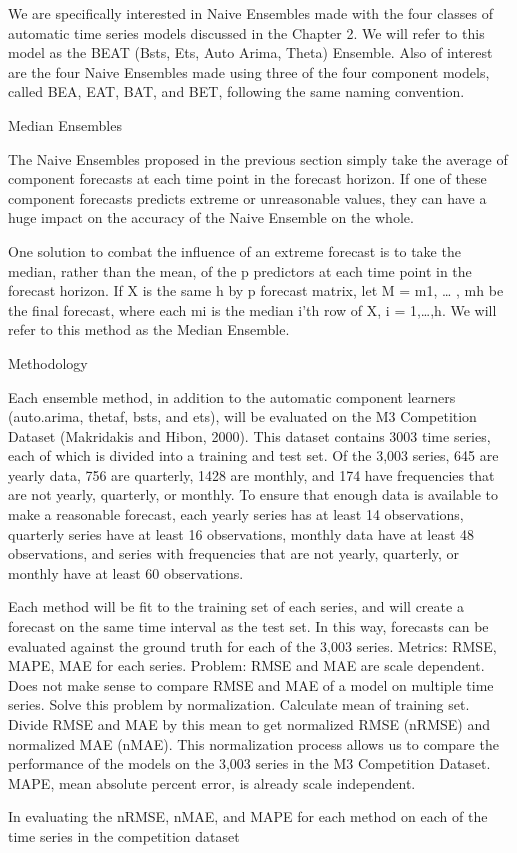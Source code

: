 \documentclass [M] {uclathes}
\begin{document}
We are specifically interested in Naive Ensembles made with the four classes of automatic time series models discussed in the Chapter 2. We will refer to this model as the BEAT (Bsts, Ets, Auto Arima, Theta) Ensemble. Also of interest are the four Naive Ensembles made using three of the four component models, called BEA, EAT, BAT, and BET, following the same naming convention.

Median Ensembles

The Naive Ensembles proposed in the previous section simply take the average of component forecasts at each time point in the forecast horizon. If one of these component forecasts predicts extreme or unreasonable values, they can have a huge impact on the accuracy of the Naive Ensemble on the whole.

One solution to combat the influence of an extreme forecast is to take the median, rather than the mean, of the p predictors at each time point in the forecast horizon. If X is the same h by p forecast matrix, let M = m1, … , mh be the final forecast, where each mi is the median i’th row of X, i = 1,…,h. We will refer to this method as the Median Ensemble.

Methodology

Each ensemble method, in addition to the automatic component learners (auto.arima, thetaf, bsts, and ets), will be evaluated on the M3 Competition Dataset (Makridakis and Hibon, 2000). This dataset contains 3003 time series, each of which is divided into a training and test set. Of the 3,003 series, 645 are yearly data, 756 are quarterly, 1428 are monthly, and 174 have frequencies that are not yearly, quarterly, or monthly. To ensure that enough data is available to make a reasonable forecast, each yearly series has at least 14 observations, quarterly series have at least 16 observations, monthly data have at least 48 observations, and series with frequencies that are not yearly, quarterly, or monthly have at least 60 observations.

Each method will be fit to the training set of each series, and will create a forecast on the same time interval as the test set. In this way, forecasts can be evaluated against the ground truth for each of the 3,003 series. 
Metrics: RMSE, MAPE, MAE for each series. Problem: RMSE and MAE are scale dependent. Does not make sense to compare RMSE and MAE of a model on multiple time series. Solve this problem by normalization. Calculate mean of training set. Divide RMSE and MAE by this mean to get normalized RMSE (nRMSE) and normalized MAE (nMAE). This normalization process allows us to compare the performance of the models on the 3,003 series in the M3 Competition Dataset. MAPE, mean absolute percent error, is already scale independent.

In evaluating the nRMSE, nMAE, and MAPE for each method on each of the time series in the competition dataset

\end{document}
